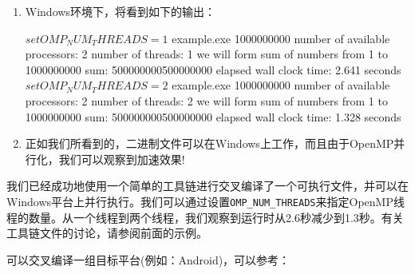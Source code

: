 \begin{enumerate}
\item Windows环境下，将看到如下的输出：

\begin{codebox}[shell]
$ set OMP_NUM_THREADS=1
$ example.exe 1000000000
number of available processors: 2
number of threads: 1
we will form sum of numbers from 1 to 1000000000
sum: 500000000500000000
elapsed wall clock time: 2.641 seconds
$ set OMP_NUM_THREADS=2
$ example.exe 1000000000
number of available processors: 2
number of threads: 2
we will form sum of numbers from 1 to 1000000000
sum: 500000000500000000
elapsed wall clock time: 1.328 seconds
\end{codebox}

\item 正如我们所看到的，二进制文件可以在Windows上工作，而且由于OpenMP并行化，我们可以观察到加速效果!

\end{enumerate}


我们已经成功地使用一个简单的工具链进行交叉编译了一个可执行文件，并可以在Windows平台上并行执行。我们可以通过设置\texttt{OMP\_NUM\_THREADS}来指定OpenMP线程的数量。从一个线程到两个线程，我们观察到运行时从2.6秒减少到1.3秒。有关工具链文件的讨论，请参阅前面的示例。


可以交叉编译一组目标平台(例如：Android)，可以参考：


